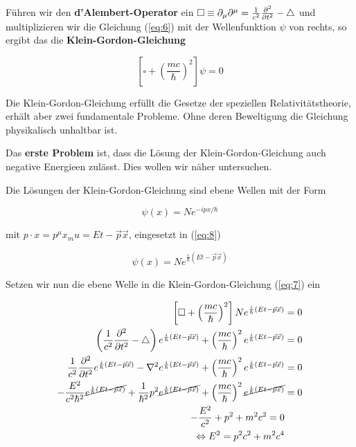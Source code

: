Führen wir den \textbf{d'Alembert-Operator} ein \(\square \equiv \partial_\mu\partial^\mu = \frac{1}{c^2}\pdiff^2_t - \triangle \) und multiplizieren wir die Gleichung (\ref{eq:6}) mit der Wellenfunktion \(\psi\) von rechts, so ergibt das die \textbf{Klein-Gordon-Gleichung}

\begin{equation}
  \label{eq:7}
 \boxed{\left[  \square + \left(\frac{mc}{\hbar}\right)^2\right]\psi  = 0 }
\end{equation}


Die Klein-Gordon-Gleichung erfüllt die Gesetze der speziellen Relativitätstheorie, erhält aber zwei fundamentale Probleme. Ohne deren Beweltigung die Gleichung physikalisch unhaltbar ist. 

Das \textbf{erste Problem} ist, dass die Lösung der Klein-Gordon-Gleichung auch negative Energieen zulässt. Dies wollen wir näher untersuchen.

Die Lösungen der  Klein-Gordon-Gleichung sind ebene Wellen mit der Form

\begin{equation}
  \label{eq:8}
\psi(x) = Ne^{-ipx/\hbar}  
\end{equation}

mit \(p\cdot x = p^\mu x_mu = Et - \vec p\vec x\), eingesetzt in (\ref{eq:8})

\begin{equation}
  \label{eq:9}
  \psi(x) = Ne^{\frac{i}{\hbar}(Et - \vec p\vec x)}
\end{equation}

Setzen wir nun die ebene Welle in die Klein-Gordon-Gleichung (\ref{eq:7})  ein

\begin{align}
  \label{eq:10}
  \left[  \square + \left(\frac{mc}{\hbar}\right)^2\right] Ne^{\frac{i}{\hbar}(Et - \vec p\vec x)}   &= 0 \\
  \left(\frac{1}{c^2}\pdiff^2_t - \triangle \right) e^{\frac{i}{\hbar}(Et - \vec p\vec x)}  + \left(\frac{mc}{\hbar}\right)^2e^{\frac{i}{\hbar}(Et - \vec p\vec x)}   &= 0 \\
 \frac{1}{c^2}\pdiff^2_t e^{\frac{i}{\hbar}(Et - \vec p\vec x)}  - \nabla^2  e^{\frac{i}{\hbar}(Et - \vec p\vec x)}  + \left(\frac{mc}{\hbar}\right)^2e^{\frac{i}{\hbar}(Et - \vec p\vec x)}   &= 0 \\
 -\frac{E^2}{c^2\hbar^2} \cancel{ e^{\frac{i}{\hbar}(Et - \vec p\vec x)}}  +\frac{1}{\hbar^2}  p^2\cancel{ e^{\frac{i}{\hbar}(Et - \vec p\vec x)}}  + \left(\frac{mc}{\hbar}\right)^2 \cancel{ e^{\frac{i}{\hbar}(Et - \vec p\vec x)}}   &= 0 \\
 -\frac{E^2}{c^2} +  p^2  + m^2c^2 = 0 \\
\Leftrightarrow  E^2 =  p^2c^2  + m^2c^4
\end{align}

